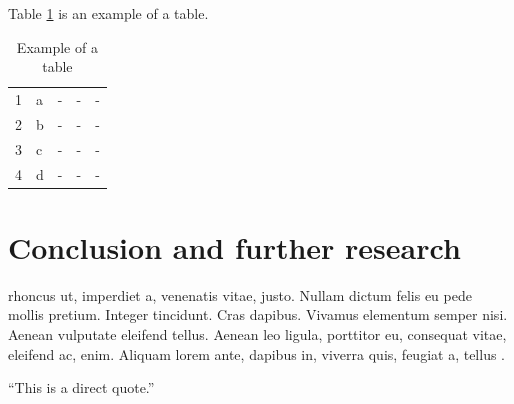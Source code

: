 Table \ref{table1} is an example of a table.



\begin{table}[]
\centering
\caption{Example of a table}
\label{table1}
\begin{tabular}{lllll}
 1 & a & - & - & - \\
 2 & b & - & - & - \\
 3 & c & - & - & - \\
 4 & d & - & - &-
\end{tabular}
\end{table}
\section{Conclusion and further research}
rhoncus ut, imperdiet a, venenatis vitae, justo. Nullam dictum felis eu pede mollis pretium. Integer tincidunt. Cras dapibus. Vivamus elementum semper nisi. Aenean vulputate eleifend tellus. Aenean leo ligula, porttitor eu, consequat vitae, eleifend ac, enim. Aliquam lorem ante, dapibus in, viverra quis, feugiat a, tellus \cite{DBLP:books/daglib/0031128}.
\newline
\newline

``This is a direct quote.'' \cite{DBLP:books/daglib/0031128} 